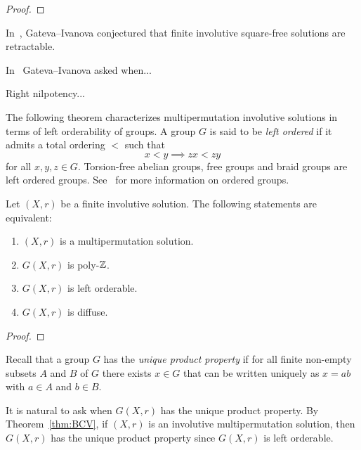 \begin{proof}
    
\end{proof}



In~\cite{MR2095675}, Gateva--Ivanova conjectured that finite involutive 
square-free solutions are retractable.


In~\cite{MR3861714} Gateva--Ivanova asked when...

Right nilpotency...

The following theorem characterizes multipermutation involutive solutions in 
terms of left orderability of groups. A group $G$ is said to be 
\emph{left ordered} if it admits a total ordering $<$ such that 
\[
x<y\implies zx<zy
\]
for all $x,y,z\in G$. Torsion-free abelian groups, 
free groups and braid groups are left ordered groups. 
See~\cite{MR3560661} for more information on ordered groups. 

 \begin{theorem}
\label{thm:BCV}
	Let $(X,r)$ be a finite involutive solution. The following statements are equivalent:
	\begin{enumerate}
		\item $(X,r)$ is a multipermutation solution.
		\item $G(X,r)$ is poly-$\mathbb{Z}$.
		\item $G(X,r)$ is left orderable.
		\item $G(X,r)$ is diffuse.
	\end{enumerate}
\end{theorem}

\begin{proof}

\end{proof}

Recall that a group $G$ has the \emph{unique product property} if 
for all finite non-empty subsets $A$ and $B$ of $G$ there exists $x\in G$ 
that can be written uniquely as $x = ab$ with $a\in A$ and $b\in B$. 

It is natural to ask when $G(X,r)$ has the unique product property. By Theorem~\ref{thm:BCV}, if $(X,r)$ is an involutive
multipermutation solution, then $G(X,r)$ has the unique product property since $G(X,r)$ is left orderable. 

